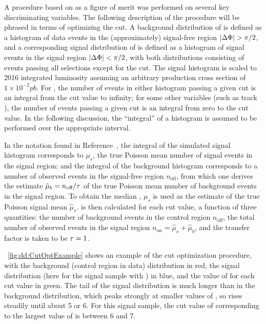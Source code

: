 A procedure based on \ZBi as a figure of merit was performed on several key discriminating variables.
The following description of the procedure will be phrased in terms of optimizing the \LxySig cut.
A background distribution of \LxySig is defined as a histogram of data events in the (approximately) signal-free region $|\Delta\Phi| > \pi/2$, and a corresponding signal distribution of \LxySig is defined as a histogram of signal events in the signal region \mbox{$|\Delta\Phi| < \pi/2$}, with both distributions consisting of events passing all selections except for the \LxySig cut.
The signal histogram is scaled to 2016 integrated luminosity assuming an arbitrary production cross section of $1\times 10^{-2}\unit{pb}$.
For \LxySig, the number of events in either histogram passing a given cut is an integral from the cut value to infinity; for some other variables (such as track \normchisq), the number of events passing a given cut is an integral from zero to the cut value.
In the following discussion, the ``integral'' of a histogram is assumed to be performed over the appropriate interval.

In the notation found in Reference~\cite{Cousins:ZBi2008}, the integral of the simulated signal histogram corresponds to ${\mu}_s$, the true Poisson mean number of signal events in the signal region;
and the integral of the background histogram corresponds to a number of observed events in the signal-free region $n_\text{off}$, from which one derives the estimate $\hat{\mu}_b = n_\text{off}/\tau$ of the true Poisson mean number of background events in the signal region.
To obtain the median \ZBi, $\mu_s$ is used as the estimate of the true Poisson signal mean $\hat{\mu}_s$.
\ZBi is then calculated for each cut value, a function of three quantities: the number of background events in the control region $n_\text{off}$, the total number of observed events in the signal region $n_\text{on} = \hat{\mu}_s + \hat{\mu}_b$, and the transfer factor is taken to be $\tau = 1$.

\Fig~\ref{fig:dd:CutOptExample} shows an example of the cut optimization procedure, with the background (control region in data) distribution in red, the signal distribution (here for the \twoMu signal sample with ) in blue, and the value of \ZBi for each cut value in green.
The tail of the signal distribution is much longer than in the background distribution, which peaks strongly at smaller values of \LxySig, so \ZBi rises steadily until about 5 or 6.
For this signal sample, the cut value of \LxySig corresponding to the largest value of \ZBi is between 6 and 7.

